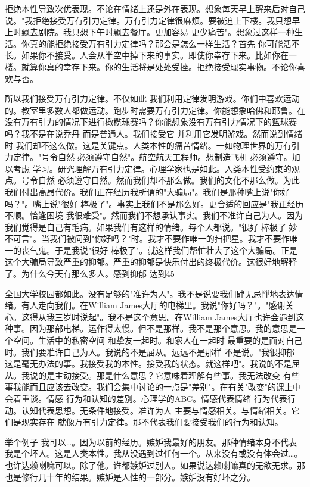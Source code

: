 拒绝本性导致次优表现。不论在情绪上还是外在表现。想象每天早上醒来后对自己说。"我拒绝接受万有引力定律。万有引力定律很麻烦。要被迫上下楼。我只想早上时飘去剧院。我只想下午时飘去餐厅。更加容易 更少痛苦"。想象过这样一种生活。你真的能拒绝接受万有引力定律吗？那会是怎么一样生活？首先 你可能活不长。如果你不接受。人会从半空中掉下来的事实。即使你幸存下来。比如你在一楼。就算你真的幸存下来。你的生活将是处处受挫。拒绝接受现实事物。不论你喜欢与否。 

所以我们接受万有引力定律。不仅如此 我们利用定律发明游戏。你们中喜欢运动的。教室里多数人都做运动。跑步时需要万有引力定律。你能想象哈佛和耶鲁。在没有万有引力的情况下进行橄榄球赛吗？你能想象没有万有引力情况下的篮球赛吗？我不是在说乔丹 而是普通人。我们接受它 并利用它发明游戏。然而说到情绪时 我们却不这么做。这是关键点。人类本性的痛苦情绪。一如物理世界的万有引力定律。"号令自然 必须遵守自然"。航空航天工程师。想制造飞机 必须遵守。加以考虑 学习。研究理解万有引力定律。心理学家也是如此。人类本性受约束的观点。号令自然 必须遵守自然。然而我们却不那么做。我们的文化不那么做。为此我们付出高昂代价。我们正在经历我所谓的"大骗局"。我们是那种嘴上说"你好吗？"。嘴上说"很好 棒极了"。事实上我们不是那么好。更合适的回应是"我正经历不顺。恰逢困境 我很难受"。然而我们不想承认事实。我们不准许自己为人。因为我们觉得是自己有毛病。如果我们有这样的情绪。每个人都说。"很好 棒极了 妙不可言"。当我们被问到"你好吗？"时。我才不要作唯一的扫把星。我才不要作唯一的丧气鬼。于是我说"很好 棒极了"。就这样我们帮忙壮大了这个大骗局。正是这个大骗局导致严重的抑郁。严重的抑郁是快乐付出的终极代价。这很好地解释了。为什么今天有那么多人。感到抑郁 达到45%

全国大学校园都如此。没有足够的"准许为人"。我不是说要我们肆无忌惮地表达情绪。有人走向我们。在William James大厅的电梯里。我说"你好吗？"。"感谢关心。这得从我三岁时说起"。我不是这个意思。在William James大厅也许会遇到这种事。因为那部电梯。运作得太慢。但不是那样。我不是那个意思。我的意思是一个空间。生活中的私密空间 和挚友一起时。和家人在一起时 最重要的是面对自己时。我们要准许自己为人。我说的不是屈从。远远不是那样 不是说。"我很抑郁 这是毫无办法的事。我接受我的本性。接受我的状态。就这样吧"。我说的不是屈从。我说的是主动接受。那是什么意思？它意味着理解有些事。我无法改变 有些事我能而且应该去改变。我们会集中讨论的一点是"差别"。在有关"改变"的课上中会着重谈。情感 行为和认知的差别。心理学的ABC。情感代表情绪 行为代表行动。认知代表思想。无条件地接受。准许为人 主要与情感相关。与情绪相关。它们是现实存在 就像万有引力定律。那不代表我们要接受我们的行为和认知。 

举个例子 我可以…。因为以前的经历。嫉妒我最好的朋友。那种情绪本身不代表我是个坏人。这是人类本性。我从没遇到过任何一个。从来没有或没有体会过…。也许达赖喇嘛可以。除了他。谁都嫉妒过别人。如果说达赖喇嘛真的无欲无求。那也是修行几十年的结果。嫉妒是人性的一部分。嫉妒没有好坏之分。 


